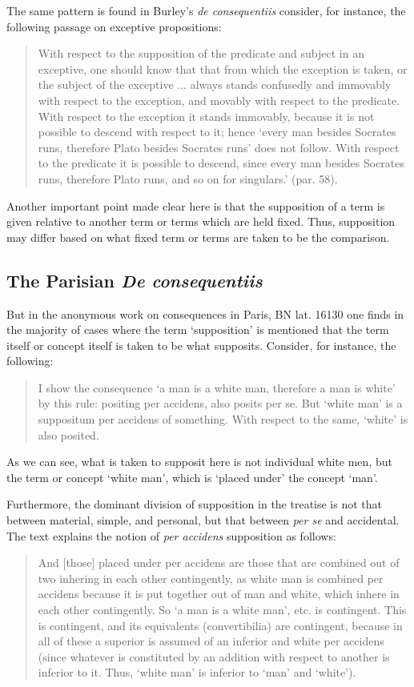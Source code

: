 \documentclass[a4paper,11pt]{article}
\begin{document}
The same pattern is found in Burley's \textit{de consequentiis} consider, for instance, the following passage on exceptive propositions:
\begin{quote}
With respect to the supposition of the predicate and subject in an exceptive, one should know that that from which the exception is taken, or the subject of the exceptive ... always stands confusedly and immovably with respect to the exception, and movably with respect to the predicate. With respect to the exception it stands immovably, because it is not possible to descend with respect to it; hence `every man besides Socrates runs, therefore Plato besides Socrates runs' does not follow. With respect to the predicate it is possible to descend, since every man besides Socrates runs, therefore Plato runs, and so on for singulars.'
(par. 58).
\end{quote}
 Another important point made clear here is that the supposition of a term is given relative to another term or terms which are held fixed. Thus, supposition may differ based on what fixed term or terms are taken to be the comparison. 

\subsection{The Parisian \textit{De consequentiis}}
But in the anonymous work on consequences in Paris, BN lat. 16130 one finds in the majority of cases where the term `supposition' is mentioned that the term itself or concept itself is taken to be what supposits. Consider, for instance, the following:

\begin{quote}
I show the consequence `a man is a white man, therefore a man is white' by this rule: positing per accidens, also posits per se. But `white man' is a suppositum per accidens of something. With respect to the same, `white' is also posited.
\end{quote}

As we can see, what is taken to supposit here is not individual white men, but the term or concept `white man', which is `placed under' the concept `man'. 

Furthermore, the dominant division of supposition in the treatise is not that between material, simple, and personal, but that between \textit{per se} and accidental. The text explains the notion of \textit{per accidens} supposition as follows:

\begin{quote}
And [those] placed under per accidens are those that are combined out of two inhering in each other contingently, as white man is combined per accidens because it is put together out of man and white, which inhere in each other contingently. So `a man is a white man', etc. is contingent. This is contingent, and its equivalents (convertibilia) are contingent, because in all of these a superior is assumed of an inferior and white per accidens (since whatever is constituted by an addition with respect to another is inferior to it. Thus, `white man' is inferior to `man' and `white').
\end{quote}
\end{document}
